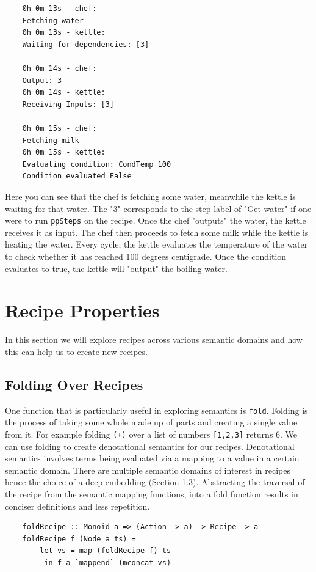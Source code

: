 \documentclass[11pt]{article}
\begin{document}
\begin{lstlisting}
    0h 0m 13s - chef:
    Fetching water
    0h 0m 13s - kettle:
    Waiting for dependencies: [3]

    0h 0m 14s - chef:
    Output: 3
    0h 0m 14s - kettle:
    Receiving Inputs: [3]

    0h 0m 15s - chef:
    Fetching milk
    0h 0m 15s - kettle:
    Evaluating condition: CondTemp 100
    Condition evaluated False
\end{lstlisting}

Here you can see that the chef is fetching some water, meanwhile the kettle is waiting
for that water. The "3" corresponds to the step label of "Get water" if one were to
run \texttt{ppSteps} on the recipe. Once the chef "outputs" the water, the kettle
receives it as input. The chef then proceeds to fetch some milk while the kettle
is heating the water. Every cycle, the kettle evaluates the temperature of the water
to check whether it has reached 100 degrees centigrade. Once the condition evaluates to true,
the kettle will "output" the boiling water.

\section{Recipe Properties}

In this section we will explore recipes across various semantic domains and how this can
help us to create new recipes.

\subsection{Folding Over Recipes}

One function that is particularly useful in exploring semantics is \texttt{fold}.
Folding is the process of taking some whole made up of parts and creating a single
value from it. For example folding \texttt{(+)} over a list of numbers \texttt{[1,2,3]}
returns 6. We can use folding to create denotational semantics \cite{hutton} for our recipes.
Denotational semantics involves terms being evaluated via a mapping to a value in a certain
semantic domain. There are multiple semantic domains of interest in recipes hence the choice
of a deep embedding (Section 1.3). Abstracting the traversal of the recipe from the
semantic mapping functions, into a fold function results in conciser definitions and
less repetition.

\begin{lstlisting}
    foldRecipe :: Monoid a => (Action -> a) -> Recipe -> a
    foldRecipe f (Node a ts) =
        let vs = map (foldRecipe f) ts
         in f a `mappend` (mconcat vs)
\end{lstlisting}
\end{document}
